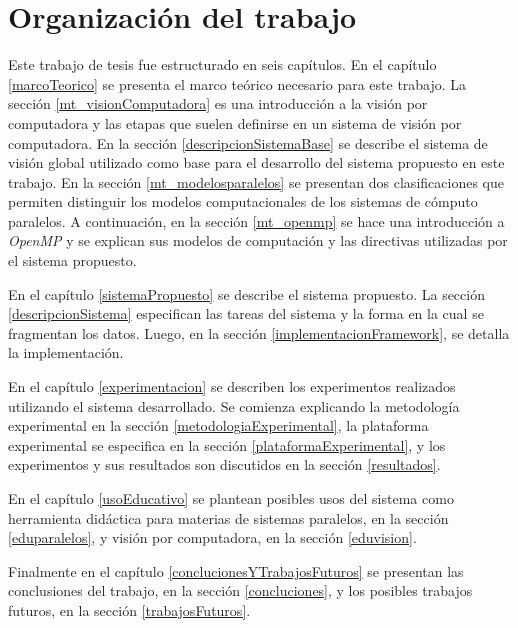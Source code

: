 
\section{Organización del trabajo}

Este trabajo de tesis fue estructurado en seis capítulos. En el capítulo
\ref{marcoTeorico} se presenta el marco teórico necesario para este trabajo. La
sección \ref{mt_visionComputadora} es una introducción a la visión por
computadora y las etapas que suelen definirse en un sistema de visión por
computadora. En la sección \ref{descripcionSistemaBase} se describe el sistema de
visión global utilizado como base para el desarrollo del sistema propuesto en
este trabajo. En la sección \ref{mt_modelosparalelos} se presentan dos
clasificaciones que permiten distinguir los modelos computacionales de los
sistemas de cómputo paralelos. A continuación, en la sección \ref{mt_openmp} se
hace una introducción a \emph{OpenMP} y se explican sus modelos de computación y
las directivas utilizadas por el sistema propuesto.

En el capítulo \ref{sistemaPropuesto} se describe el sistema propuesto. La
sección \ref{descripcionSistema} especifican las tareas del sistema y la forma en
la cual se fragmentan los datos. Luego, en la sección
\ref{implementacionFramework}, se detalla la implementación.

En el capítulo \ref{experimentacion} se describen los experimentos realizados
utilizando el sistema desarrollado. Se comienza explicando la metodología
experimental en la sección \ref{metodologiaExperimental}, la plataforma
experimental se especifica en la sección \ref{plataformaExperimental}, y los
experimentos y sus resultados son discutidos en la sección \ref{resultados}.

En el capítulo \ref{usoEducativo} se plantean posibles usos del sistema como
herramienta didáctica para materias de sistemas paralelos, en la sección
\ref{eduparalelos}, y visión por computadora, en la sección \ref{eduvision}.

Finalmente en el capítulo \ref{conclucionesYTrabajosFuturos} se presentan las
conclusiones del trabajo, en la sección \ref{concluciones}, y los posibles
trabajos futuros, en la sección \ref{trabajosFuturos}.
